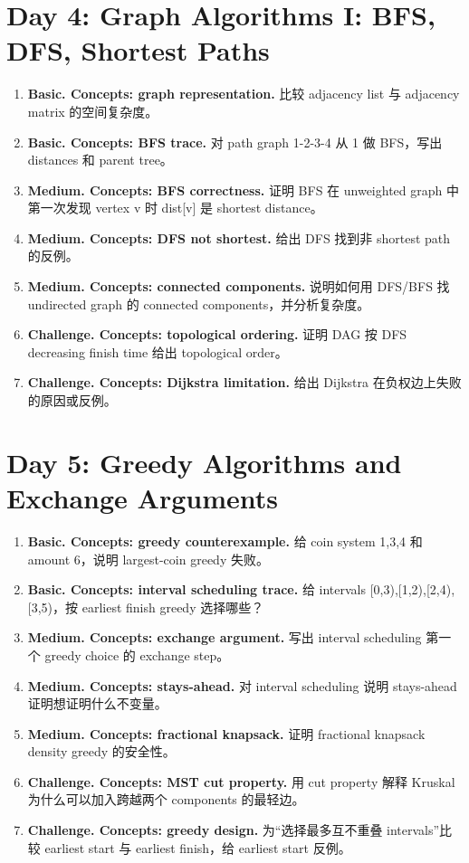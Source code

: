 \documentclass[11pt]{ctexart}
\begin{document}
\section{Day 4: Graph Algorithms I: BFS, DFS, Shortest Paths}
\begin{enumerate}
  \item \textbf{Basic. Concepts: graph representation.} 比较 adjacency list 与 adjacency matrix 的空间复杂度。
  \item \textbf{Basic. Concepts: BFS trace.} 对 path graph 1-2-3-4 从 1 做 BFS，写出 distances 和 parent tree。
  \item \textbf{Medium. Concepts: BFS correctness.} 证明 BFS 在 unweighted graph 中第一次发现 vertex v 时 dist[v] 是 shortest distance。
  \item \textbf{Medium. Concepts: DFS not shortest.} 给出 DFS 找到非 shortest path 的反例。
  \item \textbf{Medium. Concepts: connected components.} 说明如何用 DFS/BFS 找 undirected graph 的 connected components，并分析复杂度。
  \item \textbf{Challenge. Concepts: topological ordering.} 证明 DAG 按 DFS decreasing finish time 给出 topological order。
  \item \textbf{Challenge. Concepts: Dijkstra limitation.} 给出 Dijkstra 在负权边上失败的原因或反例。
\end{enumerate}

\section{Day 5: Greedy Algorithms and Exchange Arguments}
\begin{enumerate}
  \item \textbf{Basic. Concepts: greedy counterexample.} 给 coin system {1,3,4} 和 amount 6，说明 largest-coin greedy 失败。
  \item \textbf{Basic. Concepts: interval scheduling trace.} 给 intervals [0,3),[1,2),[2,4),[3,5)，按 earliest finish greedy 选择哪些？
  \item \textbf{Medium. Concepts: exchange argument.} 写出 interval scheduling 第一个 greedy choice 的 exchange step。
  \item \textbf{Medium. Concepts: stays-ahead.} 对 interval scheduling 说明 stays-ahead 证明想证明什么不变量。
  \item \textbf{Medium. Concepts: fractional knapsack.} 证明 fractional knapsack density greedy 的安全性。
  \item \textbf{Challenge. Concepts: MST cut property.} 用 cut property 解释 Kruskal 为什么可以加入跨越两个 components 的最轻边。
  \item \textbf{Challenge. Concepts: greedy design.} 为“选择最多互不重叠 intervals”比较 earliest start 与 earliest finish，给 earliest start 反例。
\end{enumerate}
\end{document}
